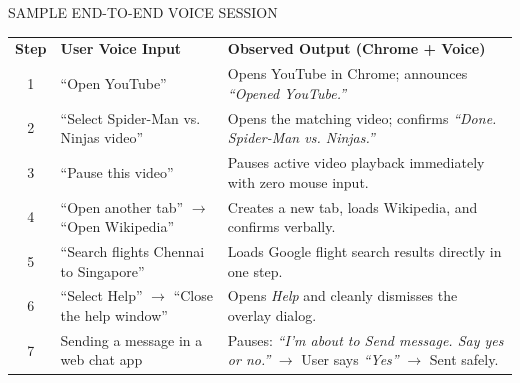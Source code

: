\documentclass[aspectratio=169,9pt]{beamer}
\begin{document}
\begin{frame}{SAMPLE END-TO-END VOICE SESSION}
\renewcommand{\arraystretch}{1.28}
\small
\begin{tabularx}{\textwidth}{@{}c >{\raggedright\arraybackslash}p{4.65cm} >{\raggedright\arraybackslash}X@{}}
\rowcolor{refSlate}
\textbf{\color{white}Step} & \textbf{\color{white}User Voice Input} & \textbf{\color{white}Observed Output (Chrome + Voice)} \\
\rowcolor{refPage}
1 & ``Open YouTube'' & Opens YouTube in Chrome; announces \textit{``Opened YouTube.''} \\
\rowcolor{refSoft}
2 & ``Select Spider-Man vs. Ninjas video'' & Opens the matching video; confirms \textit{``Done. Spider-Man vs. Ninjas.''} \\
\rowcolor{refPage}
3 & ``Pause this video'' & Pauses active video playback immediately with zero mouse input. \\
\rowcolor{refSoft}
4 & ``Open another tab'' $\rightarrow$ ``Open Wikipedia'' & Creates a new tab, loads Wikipedia, and confirms verbally. \\
\rowcolor{refPage}
5 & ``Search flights Chennai to Singapore'' & Loads Google flight search results directly in one step. \\
\rowcolor{refSoft}
6 & ``Select Help'' $\rightarrow$ ``Close the help window'' & Opens \textit{Help} and cleanly dismisses the overlay dialog. \\
\rowcolor{refPage}
7 & Sending a message in a web chat app & Pauses: \textit{``I'm about to Send message. Say yes or no.''} $\rightarrow$ User says \textit{``Yes''} $\rightarrow$ Sent safely. \\
\hline
\end{tabularx}
\end{frame}
\end{document}
